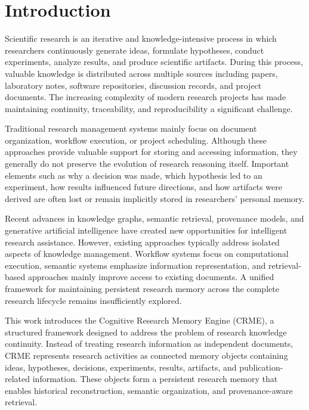 \section{Introduction}
\label{sec:introduction}

Scientific research is an iterative and knowledge-intensive process in
which researchers continuously generate ideas, formulate hypotheses,
conduct experiments, analyze results, and produce scientific artifacts.
During this process, valuable knowledge is distributed across multiple
sources including papers, laboratory notes, software repositories,
discussion records, and project documents. The increasing complexity of
modern research projects has made maintaining continuity, traceability,
and reproducibility a significant challenge.

Traditional research management systems mainly focus on document
organization, workflow execution, or project scheduling. Although these
approaches provide valuable support for storing and accessing
information, they generally do not preserve the evolution of research
reasoning itself. Important elements such as why a decision was made,
which hypothesis led to an experiment, how results influenced future
directions, and how artifacts were derived are often lost or remain
implicitly stored in researchers' personal memory.

Recent advances in knowledge graphs, semantic retrieval, provenance
models, and generative artificial intelligence have created new
opportunities for intelligent research assistance. However, existing
approaches typically address isolated aspects of knowledge management.
Workflow systems focus on computational execution, semantic systems
emphasize information representation, and retrieval-based approaches
mainly improve access to existing documents. A unified framework for
maintaining persistent research memory across the complete research
lifecycle remains insufficiently explored.

This work introduces the Cognitive Research Memory Engine (CRME), a
structured framework designed to address the problem of research
knowledge continuity. Instead of treating research information as
independent documents, CRME represents research activities as connected
memory objects containing ideas, hypotheses, decisions, experiments,
results, artifacts, and publication-related information. These objects
form a persistent research memory that enables historical reconstruction,
semantic organization, and provenance-aware retrieval.

